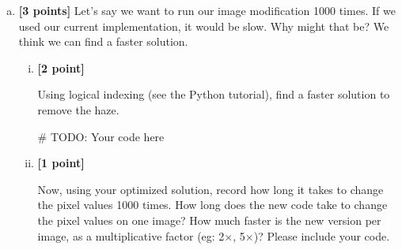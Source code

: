 \documentclass[11pt]{article}
\begin{document}
\begin{enumerate}[(a)]
\begin{enumerate}[(i)]

\end{enumerate}

\item \textbf{[3 points]} Let's say we want to run our image modification 1000 times. If we used our current implementation, it would be slow. Why might that be? We think we can find a faster solution.

\begin{enumerate}[(i)]
\item \textbf{[2 point]}
\begin{tcolorbox}[colback=orange!5!white,colframe=orange!75!black] 
Using logical indexing (see the Python tutorial), find a faster solution to remove the haze. 
\end{tcolorbox}

\begin{tcolorbox}[colback=white!5!white,colframe=green!75!black,height=6cm]
    \begin{python}
    # TODO: Your code here
    
    \end{python}
\end{tcolorbox}

\pagebreak
\item \textbf{[1 point]}
\begin{tcolorbox}[colback=orange!5!white,colframe=orange!75!black]
Now, using your optimized solution, record how long it takes to change the pixel values 1000 times. How long does the new code take to change the pixel values on one image? How much faster is the new version per image, as a
multiplicative factor (eg: 2×, 5×)? Please include your code.
\end{tcolorbox}


\end{enumerate}
\end{enumerate}
\end{document}
